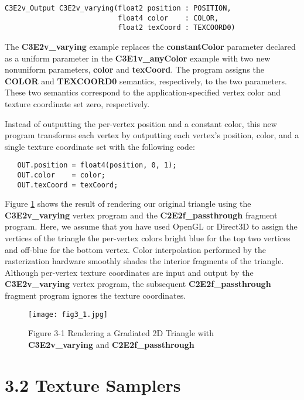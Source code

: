 \documentclass[../main.tex]{subfiles}
\begin{document}
\FloatBarrier
\begin{lstlisting}
C3E2v_Output C3E2v_varying(float2 position : POSITION,
                           float4 color    : COLOR,
                           float2 texCoord : TEXCOORD0)
\end{lstlisting}
\FloatBarrier

The \textbf{C3E2v_varying} example replaces the \textbf{constantColor} parameter declared as a uniform parameter in the \textbf{C3E1v_anyColor} example with two new nonuniform parameters, \textbf{color} and \textbf{texCoord}. The program assigns the \textbf{COLOR} and \textbf{TEXCOORD0} semantics, respectively, to the two parameters. These two semantics correspond to the application-specified vertex color and texture coordinate set zero, respectively.

Instead of outputting the per-vertex position and a constant color, this new program transforms each vertex by outputting each vertex's position, color, and a single texture coordinate set with the following code:

\FloatBarrier
\begin{lstlisting}
   OUT.position = float4(position, 0, 1);
   OUT.color    = color;
   OUT.texCoord = texCoord;
\end{lstlisting}
\FloatBarrier

Figure \ref{fig:3-1} shows the result of rendering our original triangle using the \textbf{C3E2v_varying} vertex program and the \textbf{C2E2f_passthrough} fragment program. Here, we assume that you have used OpenGL or Direct3D to assign the vertices of the triangle the per-vertex colors bright blue for the top two vertices and off-blue for the bottom vertex. Color interpolation performed by the rasterization hardware smoothly shades the interior fragments of the triangle. Although per-vertex texture coordinates are input and output by the \textbf{C3E2v_varying} vertex program, the subsequent \textbf{C2E2f_passthrough} fragment program ignores the texture coordinates.

\begin{figure}
    \centering
    \texttt{[image: fig3\_1.jpg]}
    \caption{Figure 3-1 Rendering a Gradiated 2D Triangle with \textbf{C3E2v_varying} and \textbf{C2E2f_passthrough}}
    \label{fig:3-1}
\end{figure}

\section{3.2 Texture Samplers}
\end{document}

